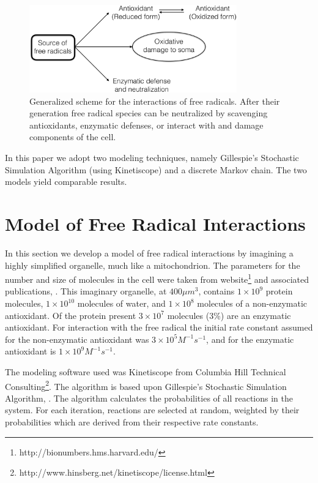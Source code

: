 \documentclass[preprint,12pt,authoryear]{elsarticle}
\begin{document}
\begin{figure}
\begin{center}
\includegraphics[width=0.8\textwidth]{Figure1.eps}
\end{center}
\caption{\label{fig:g1} Generalized scheme for the interactions of free radicals. After their generation
free radical species can be neutralized by scavenging antioxidants, enzymatic defenses, or
interact with and damage components of the cell.}
\end{figure}

In this paper we adopt two modeling techniques, namely Gillespie’s Stochastic Simulation Algorithm
(using Kinetiscope) and a discrete Markov chain. The two models yield comparable results.


\section{Model of Free Radical Interactions}

In this section we develop a model of free radical interactions 
by imagining a highly simplified organelle, much like a
mitochondrion. The parameters for the number and size of molecules in the cell were taken from
 website\footnote{http://bionumbers.hms.harvard.edu/}
and associated publications, \citet{Milo:2015uq}.
This imaginary organelle, at $400 \mu m^3$, contains $1 \times 10^9$ protein molecules, $1 \times 10^{10}$
molecules of water, and $1 \times 10^8$ molecules of a non-enzymatic antioxidant.
Of the protein present $3 \times 10^7$ molecules (3\%) are an enzymatic antioxidant.
For interaction with the free radical the initial rate constant assumed for the non-enzymatic antioxidant was
$3 \times 10^5 M^{-1} s^{-1}$, and for the enzymatic antioxidant is $1 \times 10^ 9 M^{-1} s^{-1}$.


The  modeling software used was Kinetiscope from Columbia Hill Technical
Consulting\footnote{http://www.hinsberg.net/kinetiscope/license.html}. 
The algorithm is based upon Gillespie's Stochastic Simulation Algorithm,  \citet{Gillespie:2007bx}. 
The algorithm calculates the probabilities of all reactions in the system. 
For each iteration, reactions are selected at random, weighted by their probabilities which are 
derived from their respective rate constants.
\end{document}
